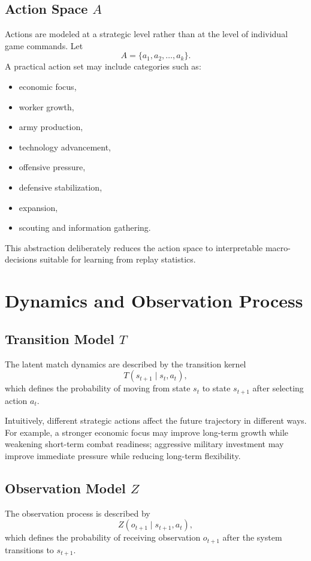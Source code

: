 \documentclass[11pt,a4paper]{article}
\begin{document}
\subsection{Action Space \texorpdfstring{$A$}{A}}
Actions are modeled at a strategic level rather than at the level of individual game commands. Let
\[
A = \{a_1, a_2, \dots, a_k\}.
\]
A practical action set may include categories such as:
\begin{itemize}[leftmargin=1.8em]
    \item economic focus,
    \item worker growth,
    \item army production,
    \item technology advancement,
    \item offensive pressure,
    \item defensive stabilization,
    \item expansion,
    \item scouting and information gathering.
\end{itemize}

This abstraction deliberately reduces the action space to interpretable macro-decisions suitable for learning from replay statistics.

\section{Dynamics and Observation Process}

\subsection{Transition Model \texorpdfstring{$T$}{T}}
The latent match dynamics are described by the transition kernel
\[
T(s_{t+1}\mid s_t, a_t),
\]
which defines the probability of moving from state $s_t$ to state $s_{t+1}$ after selecting action $a_t$.

Intuitively, different strategic actions affect the future trajectory in different ways. For example, a stronger economic focus may improve long-term growth while weakening short-term combat readiness; aggressive military investment may improve immediate pressure while reducing long-term flexibility.

\subsection{Observation Model \texorpdfstring{$Z$}{Z}}
The observation process is described by
\[
Z(o_{t+1}\mid s_{t+1}, a_t),
\]
which defines the probability of receiving observation $o_{t+1}$ after the system transitions to $s_{t+1}$.
\end{document}
